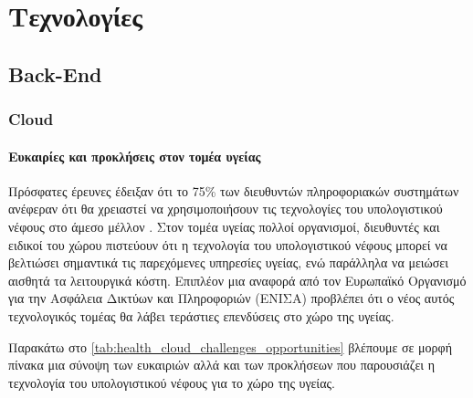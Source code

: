 \graphicspath{ {Figures/technology_stack/} }
\chapter{Τεχνολογίες}\label{ch:Development Stack}
\section{Back-End}
	\subsection{Cloud}
	\subsubsection{Ευκαιρίες και προκλήσεις στον τομέα υγείας}
	Πρόσφατες έρευνες έδειξαν ότι το 75\% των διευθυντών πληροφοριακών συστημάτων ανέφεραν ότι θα χρειαστεί να χρησιμοποιήσουν τις τεχνολογίες του υπολογιστικού νέφους στο άμεσο μέλλον \cite{danekCanadaCloud}\cite{cloudComputingIncrease}. Στον τομέα υγείας πολλοί οργανισμοί, διευθυντές και ειδικοί του χώρου πιστεύουν ότι η τεχνολογία του υπολογιστικού νέφους μπορεί να βελτιώσει σημαντικά τις παρεχόμενες υπηρεσίες υγείας, ενώ παράλληλα να μειώσει αισθητά τα λειτουργικά κόστη\cite{Dudley2010}\cite{Schweitzer2012}\cite{Blumenthal2009}\cite{Kabachinski2011}. Επιπλέον μια αναφορά από τον Ευρωπαϊκό Οργανισμό για την Ασφάλεια Δικτύων και Πληροφοριών (ΕΝΙΣΑ) προβλέπει ότι ο νέος αυτός τεχνολογικός τομέας θα λάβει τεράστιες επενδύσεις στο χώρο της υγείας\cite{bannermanCloud}. 

Παρακάτω στο \ref{tab:health_cloud_challenges_opportunities} βλέπουμε σε μορφή πίνακα μια σύνοψη των ευκαιριών αλλά και των προκλήσεων που παρουσιάζει η τεχνολογία του υπολογιστικού νέφους για το χώρο της υγείας.
	
